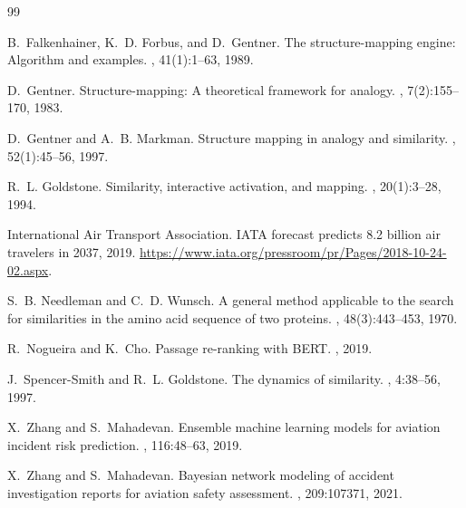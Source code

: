 \documentclass[11pt]{article}
\begin{document}
\begin{thebibliography}{99}

B.~Falkenhainer, K.~D. Forbus, and D.~Gentner.
\newblock The structure-mapping engine: Algorithm and examples.
, 41(1):1--63, 1989.

D.~Gentner.
\newblock Structure-mapping: A theoretical framework for analogy.
, 7(2):155--170, 1983.

D.~Gentner and A.~B. Markman.
\newblock Structure mapping in analogy and similarity.
, 52(1):45--56, 1997.

R.~L. Goldstone.
\newblock Similarity, interactive activation, and mapping.
, 20(1):3--28, 1994.

International Air Transport Association.
\newblock IATA forecast predicts 8.2 billion air travelers in 2037, 2019.
\newblock \url{https://www.iata.org/pressroom/pr/Pages/2018-10-24-02.aspx}.

S.~B. Needleman and C.~D. Wunsch.
\newblock A general method applicable to the search for similarities in the amino acid sequence of two proteins.
, 48(3):443--453, 1970.

R.~Nogueira and K.~Cho.
\newblock Passage re-ranking with {BERT}.
, 2019.

J.~Spencer-Smith and R.~L. Goldstone.
\newblock The dynamics of similarity.
, 4:38--56, 1997.

X.~Zhang and S.~Mahadevan.
\newblock Ensemble machine learning models for aviation incident risk prediction.
, 116:48--63, 2019.

X.~Zhang and S.~Mahadevan.
\newblock Bayesian network modeling of accident investigation reports for aviation safety assessment.
, 209:107371, 2021.

\end{thebibliography}
\end{document}
